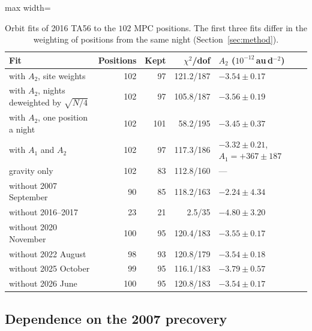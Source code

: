 \documentclass[3p,11pt]{elsarticle}
\begin{document}
\begin{table}[t]
\centering\small
\caption{Orbit fits of 2016 TA56 to the $102$ MPC positions. The first three fits differ
in the weighting of positions from the same night (Section~\ref{sec:method}).}
\label{tab:fits}
\begin{adjustbox}{max width=\textwidth}
\begin{tabular}{lrrrl}
\toprule
Fit & Positions & Kept & $\chi^2$/dof & $A_2$ ($10^{-12}$\,au\,d$^{-2}$) \\
\midrule
with $A_2$, site weights & 102 & 97 & 121.2/187 & $-3.54\pm0.17$ \\
with $A_2$, nights deweighted by $\sqrt{N/4}$ & 102 & 97 & 105.8/187 & $-3.56\pm0.19$ \\
with $A_2$, one position a night & 102 & 101 & 58.2/195 & $-3.45\pm0.37$ \\
with $A_1$ and $A_2$ & 102 & 97 & 117.3/186 & $-3.32\pm0.21$, $A_1=+367\pm187$ \\
gravity only & 102 & 83 & 112.8/160 & --- \\
without 2007 September & 90 & 85 & 118.2/163 & $-2.24\pm4.34$ \\
without 2016--2017 & 23 & 21 & 2.5/35 & $-4.80\pm3.20$ \\
without 2020 November & 100 & 95 & 120.4/183 & $-3.55\pm0.17$ \\
without 2022 August & 98 & 93 & 120.8/179 & $-3.54\pm0.18$ \\
without 2025 October & 99 & 95 & 116.1/183 & $-3.79\pm0.57$ \\
without 2026 June & 100 & 95 & 120.8/183 & $-3.54\pm0.17$ \\
\bottomrule
\end{tabular}
\end{adjustbox}
\end{table}

\subsection{Dependence on the 2007 precovery}\label{sec:precovery}
\end{document}
